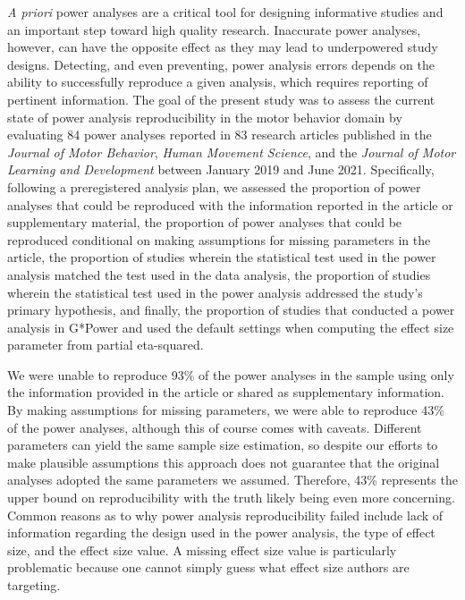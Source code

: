 \documentclass[
  man, donotrepeattitle,mask,floatsintext]{apa7}
\begin{document}
\emph{A priori} power analyses are a critical tool for designing informative studies and an important step toward high quality research. Inaccurate power analyses, however, can have the opposite effect as they may lead to underpowered study designs. Detecting, and even preventing, power analysis errors depends on the ability to successfully reproduce a given analysis, which requires reporting of pertinent information. The goal of the present study was to assess the current state of power analysis reproducibility in the motor behavior domain by evaluating 84 power analyses reported in 83 research articles published in the \emph{Journal of Motor Behavior}, \emph{Human Movement Science}, and the \emph{Journal of Motor Learning and Development} between January 2019 and June 2021. Specifically, following a preregistered analysis plan, we assessed the proportion of power analyses that could be reproduced with the information reported in the article or supplementary material, the proportion of power analyses that could be reproduced conditional on making assumptions for missing parameters in the article, the proportion of studies wherein the statistical test used in the power analysis matched the test used in the data analysis, the proportion of studies wherein the statistical test used in the power analysis addressed the study's primary hypothesis, and finally, the proportion of studies that conducted a power analysis in G*Power and used the default settings when computing the effect size parameter from partial eta-squared.

We were unable to reproduce 93\% of the power analyses in the sample using only the information provided in the article or shared as supplementary information. By making assumptions for missing parameters, we were able to reproduce 43\% of the power analyses, although this of course comes with caveats. Different parameters can yield the same sample size estimation, so despite our efforts to make plausible assumptions this approach does not guarantee that the original analyses adopted the same parameters we assumed. Therefore, 43\% represents the upper bound on reproducibility with the truth likely being even more concerning. Common reasons as to why power analysis reproducibility failed include lack of information regarding the design used in the power analysis, the type of effect size, and the effect size value. A missing effect size value is particularly problematic because one cannot simply guess what effect size authors are targeting.
\end{document}
